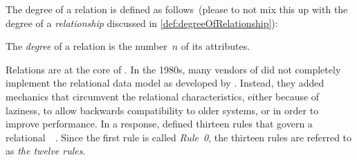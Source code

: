 The degree of a relation is defined as follows~(please to not mix this up with the degree of a \emph{relationship} discussed in \cref{def:degreeOfRelationship}):%
%
\begin{definition}%
The \emph{degree} of a relation is the number~$n$ of its attributes.%
\end{definition}%
%
Relations are at the core of .%
%
%
In the 1980s, many vendors of  did not completely implement the relational data model as developed by \citeauthor{C1985IYDRR}.
Instead, they added mechanics that circumvent the relational characteristics, either because of laziness, to allow backwards compatibility to older systems, or in order to improve performance.
In a response, \citeauthor{C1985IYDRR} defined thirteen rules that govern a relational~~\cite{C1985IYDRR,C1986AESFDBMSTACTBR,S2024D:LDMRMRA,SP2002STYSI2D,SPMP1998SI2TDDASVEI12T}.
Since the first rule is called \emph{Rule~0}, the thirteen rules are referred to as \emph{the twelve rules}.%
%
